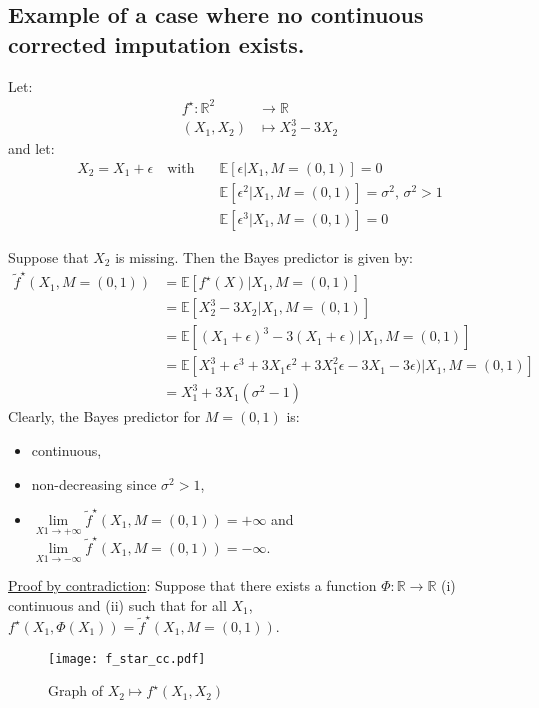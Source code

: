 \documentclass{article}
\newcommand{\RR}{\mathbb{R}}
\newcommand{\E}{\mathbb{E}}
\newcommand{\br}[1]{\left(#1\right)}
\newcommand{\sqb}[1]{\left[#1\right]}
\theoremstyle{plain}
\begin{document}
\subsection{Example of a case where no continuous corrected imputation exists.}
\label{ss:no_cc}
Let:
\begin{align*}
    f^\star: \RR^2 &\to \RR\\
    (X_1, X_2) & \mapsto X_2^3 - 3X_2
\end{align*}
and let:
\begin{align*}
    X_2 = X_1 + \epsilon \quad \text{with} \quad & \E \sqb{\epsilon | X_1, M=(0, 1)} = 0\\
    & \E \sqb{\epsilon^2|X_1, M=(0, 1)} = \sigma^2, \, \sigma^2 > 1\\
    & \E \sqb{\epsilon^3|X_1, M=(0, 1)} = 0
\end{align*}

Suppose that $X_2$ is missing. Then the Bayes predictor is given by:
\begin{align*}
    \tilde f^\star(X_1, M=(0, 1)) &= \E \sqb{f^\star(X) | X_1, M=(0, 1)}\\
    &= \E \sqb{X_2^3 - 3X_2| X_1, M=(0, 1)}\\
    &= \E \sqb{\br{X_1 + \epsilon}^3 - 3\br{X_1 + \epsilon} | X_1, M=(0, 1)}\\
    &= \E \sqb{X_1^3 + \epsilon^3 + 3X_1\epsilon^2 + 3X_1^2\epsilon - 3X_1 -3\epsilon) | X_1, M=(0, 1)}\\
    &= X_1^3 + 3X_1(\sigma^2 - 1)
\end{align*}
Clearly, the Bayes predictor for $M = (0, 1)$ is:
\begin{itemize}
    \item continuous,
    \item non-decreasing since $\sigma^2>1$,
    \item $\underset{X1 \to +\infty}{\lim} \tilde f^\star(X_1, M=(0, 1)) = +\infty$ and $\underset{X1 \to -\infty}{\lim} \tilde f^\star(X_1, M=(0, 1)) = -\infty$.
\end{itemize}

\underline{Proof by contradiction}: Suppose that there exists a function $\Phi: \RR \to \RR$ (i) continuous and (ii) such that for all $X_1$, $f^\star(X_1, \Phi(X_1)) = \tilde f^\star(X_1, M=(0, 1))$.

\begin{figure}
    \centering
    \texttt{[image: f\_star\_cc.pdf]}
    \caption{Graph of $X_2 \mapsto f^\star(X_1, X_2)$}
    \label{fig:f_star_cc}
\end{figure}
\end{document}
